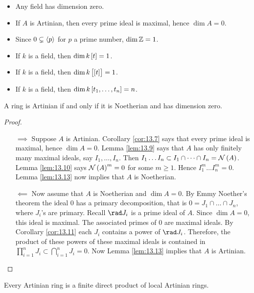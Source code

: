 \begin{example*}
\hfill
\begin{itemize}
\item Any field has dimension zero.
\item If $ A $ is Artinian, then every prime ideal is maximal, hence $ \dim A = 0 $.
\item Since $ 0 \subsetneq \left\langle p \right\rangle $ for $ p $ a prime number, $ \dim \mathbb{Z} = 1 $.
\item If $ k $ is a field, then $ \dim k\sbr{t} = 1 $.
\item If $ k $ is a field, then $ \dim k\sbr{\sbr{t}} = 1 $.
\item If $ k $ is a field, then $ \dim k\sbr{t_1, \dots, t_n} = n $.
\end{itemize}
\end{example*}

\begin{theorem}
\label{thm:13.15}
A ring is Artinian if and only if it is Noetherian and has dimension zero.
\end{theorem}

\begin{proof}
\hfill
\begin{itemize}
\item[$ \implies $] Suppose $ A $ is Artinian. Corollary \ref{cor:13.7} says that every prime ideal is maximal, hence $ \dim A = 0 $. Lemma \ref{lem:13.9} says that $ A $ has only finitely many maximal ideals, say $ I_1, \dots, I_n $. Then $ I_1 \dots I_n \subset I_1 \cap \dots \cap I_n = \NNN\br{A} $. Lemma \ref{lem:13.10} says $ \NNN\br{A}^m = 0 $ for some $ m \ge 1 $. Hence $ I_1^m \dots I_n^m = 0 $. Lemma \ref{lem:13.13} now implies that $ A $ is Noetherian.
\item[$ \impliedby $] Now assume that $ A $ is Noetherian and $ \dim A = 0 $. By Emmy Noether's theorem the ideal $ 0 $ has a primary decomposition, that is $ 0 = J_1 \cap \dots \cap J_n $, where $ J_i $'s are primary. Recall $ \rad J_i $ is a prime ideal of $ A $. Since $ \dim A = 0 $, this ideal is maximal. The associated primes of $ 0 $ are maximal ideals. By Corollary \ref{cor:13.11} each $ J_i $ contains a power of $ \rad J_i $. Therefore, the product of these powers of these maximal ideals is contained in $ \prod_{i = 1}^n J_i \subset \bigcap_{i = 1}^n J_i = 0 $. Now Lemma \ref{lem:13.13} implies that $ A $ is Artinian.
\end{itemize}
\end{proof}

\begin{theorem}
\label{thm:13.16}
Every Artinian ring is a finite direct product of local Artinian rings.
\end{theorem}

